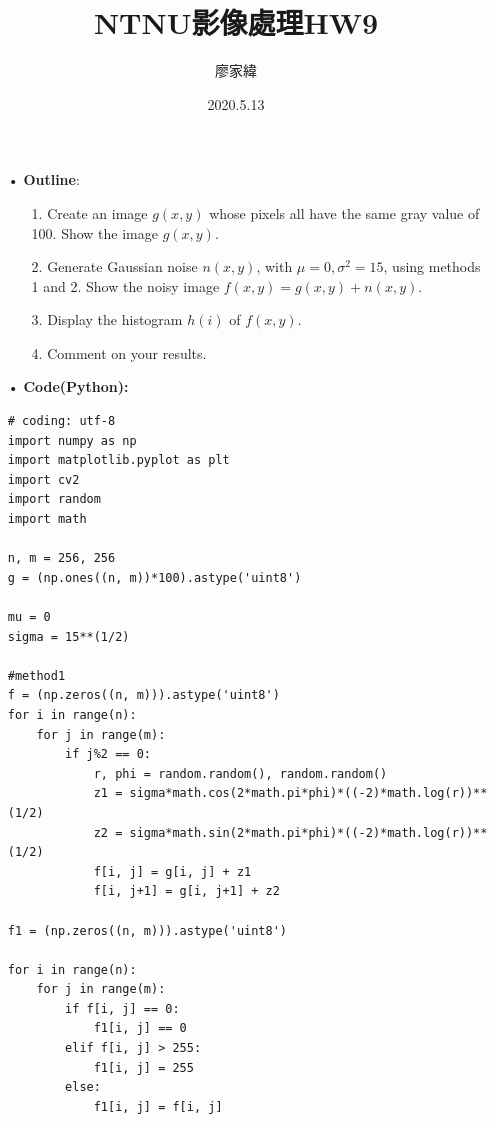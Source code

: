 \documentclass[12pt,a4paper]{article}
\title{NTNU影像處理HW9}
\author{廖家緯}
\date{2020.5.13}
\begin{document}
\maketitle
\fontsize{12pt}{20pt}\selectfont
\setlength{\baselineskip}{20pt}

\pagestyle{fancy}
\lhead{}
\chead{}
\rhead{}
\lfoot{}
\cfoot{\thepage}
\rfoot{}
\renewcommand{\headrulewidth}{0pt} %
\renewcommand{\footrulewidth}{0pt} %




\begin{enumerate}
\item[•]{\bf Outline}:
\begin{enumerate}
\item[1.]Create an image $g(x,y)$ whose pixels all have the same gray value of 100. Show the image $g(x,y)$.
\item[2.]Generate Gaussian noise $n(x,y)$, with                        $\mu =0, \sigma^2 = 15$, using methods 1 and 2. Show the noisy image $f(x,y)=g(x,y)+n(x,y)$.  
\item[3.]
Display the histogram $h(i)$ of $f(x,y)$.
\item[4.]
Comment on your results.\\
\end{enumerate}

\item[•]
{\bf Code(Python):}
\begin{lstlisting}
# coding: utf-8
import numpy as np
import matplotlib.pyplot as plt
import cv2
import random
import math

n, m = 256, 256
g = (np.ones((n, m))*100).astype('uint8')

mu = 0
sigma = 15**(1/2)

#method1
f = (np.zeros((n, m))).astype('uint8')
for i in range(n):
    for j in range(m):
        if j%2 == 0:
            r, phi = random.random(), random.random()
            z1 = sigma*math.cos(2*math.pi*phi)*((-2)*math.log(r))**(1/2)
            z2 = sigma*math.sin(2*math.pi*phi)*((-2)*math.log(r))**(1/2)
            f[i, j] = g[i, j] + z1
            f[i, j+1] = g[i, j+1] + z2
            
f1 = (np.zeros((n, m))).astype('uint8')

for i in range(n):
    for j in range(m):
        if f[i, j] == 0:
            f1[i, j] == 0
        elif f[i, j] > 255:
            f1[i, j] = 255
        else:
            f1[i, j] = f[i, j]


\end{lstlisting}
\end{enumerate}
\end{document}
